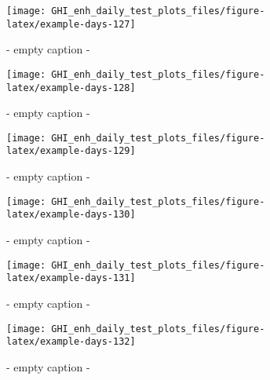 \documentclass[
  10pt,
  a4paper,oneside]{article}
\begin{document}
\begin{figure}[H]

{\centering \texttt{[image: GHI\_enh\_daily\_test\_plots\_files/figure-latex/example-days-127]} 

}

\caption{ - empty caption - }\label{fig:example-days-127}
\end{figure}

\begin{figure}[H]

{\centering \texttt{[image: GHI\_enh\_daily\_test\_plots\_files/figure-latex/example-days-128]} 

}

\caption{ - empty caption - }\label{fig:example-days-128}
\end{figure}

\begin{figure}[H]

{\centering \texttt{[image: GHI\_enh\_daily\_test\_plots\_files/figure-latex/example-days-129]} 

}

\caption{ - empty caption - }\label{fig:example-days-129}
\end{figure}

\begin{figure}[H]

{\centering \texttt{[image: GHI\_enh\_daily\_test\_plots\_files/figure-latex/example-days-130]} 

}

\caption{ - empty caption - }\label{fig:example-days-130}
\end{figure}

\begin{figure}[H]

{\centering \texttt{[image: GHI\_enh\_daily\_test\_plots\_files/figure-latex/example-days-131]} 

}

\caption{ - empty caption - }\label{fig:example-days-131}
\end{figure}

\begin{figure}[H]

{\centering \texttt{[image: GHI\_enh\_daily\_test\_plots\_files/figure-latex/example-days-132]} 

}

\caption{ - empty caption - }\label{fig:example-days-132}
\end{figure}
\end{document}
